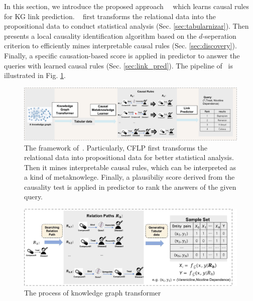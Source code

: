 In this section, we introduce the proposed approach~\dname~ which learns causal rules for KG link prediction.
\dname~ first transforms the relational data into the propositional data to conduct statistical analysis (Sec. \ref{sec:tabularnizar}).
Then \dname~ presents a local causality identification algorithm based on the $d$-seperation criterion to efficiently mines interpretable causal rules (Sec. \ref{sec:discovery}).
Finally, a specific causation-based score is applied in predictor to answer the queries with learned causal rules (Sec. \ref{sec:link_pred}).
The pipeline of \dname~is illustrated in Fig. \ref{fig:framwork}.
\begin{figure}[htbp]
\begin{center}
\includegraphics[width=18cm]{submissions/causal-meta-knowledge/figures/cmlp.png}
\end{center}
\caption{The framework of~\dname. Particularly, CFLP first transforms the relational data into propositional data for better statistical analysis. Then it mines interpretable causal rules, which can be interpreted as a kind of metaknowlege\cite{evans2011metaknowledge}.
Finally, a plausibiliy score derived from the causality test is applied in predictor to rank the answers of the given query.}
\label{fig:framwork}
\end{figure}
\begin{figure}[hbp]
\begin{center}
\includegraphics[width=14cm]{submissions/causal-meta-knowledge/figures/transformer.jpg}
\end{center}
\caption{The process of knowledge graph transformer}
\label{fig:tabular}
\vspace{-0.6cm}
\end{figure}

